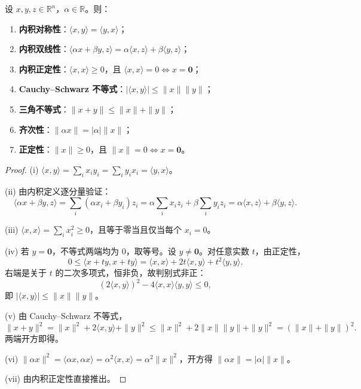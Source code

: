 \begin{proposition}[内积与范数的基本性质]\label{prop:inner_norm_properties}
设 $x, y, z \in \mathbb{R}^n$，$\alpha \in \mathbb{R}$。则：
\begin{enumerate}[label=(\roman*)]
    \item \textbf{内积对称性}：$\langle x, y \rangle = \langle y, x \rangle$；
    \item \textbf{内积双线性}：$\langle \alpha x + \beta y, z \rangle = \alpha \langle x, z \rangle + \beta \langle y, z \rangle$；
    \item \textbf{内积正定性}：$\langle x, x \rangle \ge 0$，且 $\langle x, x \rangle = 0 \iff x = \mathbf{0}$；
    \item \textbf{Cauchy--Schwarz 不等式}：$|\langle x, y \rangle| \le \|x\| \|y\|$；
    \item \textbf{三角不等式}：$\|x + y\| \le \|x\| + \|y\|$；
    \item \textbf{齐次性}：$\|\alpha x\| = |\alpha| \|x\|$；
    \item \textbf{正定性}：$\|x\| \ge 0$，且 $\|x\| = 0 \iff x = \mathbf{0}$。
\end{enumerate}
\end{proposition}

\begin{proof}
(i) $\langle x, y \rangle = \sum_i x_i y_i = \sum_i y_i x_i = \langle y, x \rangle$。

(ii) 由内积定义逐分量验证：
\[
\langle \alpha x + \beta y, z \rangle = \sum_i (\alpha x_i + \beta y_i) z_i = \alpha \sum_i x_i z_i + \beta \sum_i y_i z_i = \alpha \langle x, z \rangle + \beta \langle y, z \rangle.
\]

(iii) $\langle x, x \rangle = \sum_i x_i^2 \ge 0$，且等于零当且仅当每个 $x_i = 0$。

(iv) 若 $y = \mathbf{0}$，不等式两端均为 $0$，取等号。设 $y \neq \mathbf{0}$。对任意实数 $t$，由正定性，
\[
0 \le \langle x + t y, x + t y \rangle = \langle x, x \rangle + 2t \langle x, y \rangle + t^2 \langle y, y \rangle.
\]
右端是关于 $t$ 的二次多项式，恒非负，故判别式非正：
\[
(2 \langle x, y \rangle)^2 - 4 \langle x, x \rangle \langle y, y \rangle \le 0,
\]
即 $|\langle x, y \rangle| \le \|x\| \|y\|$。

(v) 由 Cauchy--Schwarz 不等式，
\[
\|x + y\|^2 = \|x\|^2 + 2\langle x, y \rangle + \|y\|^2 \le \|x\|^2 + 2\|x\| \|y\| + \|y\|^2 = (\|x\| + \|y\|)^2.
\]
两端开方即得。

(vi) $\|\alpha x\|^2 = \langle \alpha x, \alpha x \rangle = \alpha^2 \langle x, x \rangle = \alpha^2 \|x\|^2$，开方得 $\|\alpha x\| = |\alpha| \|x\|$。

(vii) 由内积正定性直接推出。
\end{proof}

